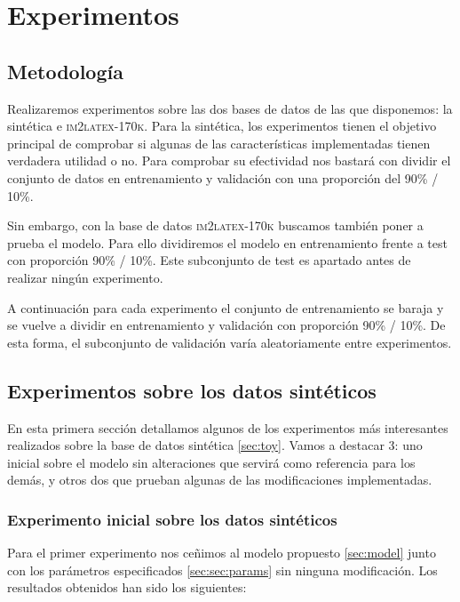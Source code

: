 \documentclass[a4paper, 20pt, dvipsnames]{article}
\begin{document}

\section{Experimentos}

\subsection{Metodología}

Realizaremos experimentos sobre las dos bases de datos de las que disponemos: la
sintética e \textsc{im2latex-170k}. Para la sintética, los experimentos tienen
el objetivo principal de comprobar si algunas de las características
implementadas tienen verdadera utilidad o no. Para comprobar su efectividad nos
bastará con dividir el conjunto de datos en entrenamiento y validación con una
proporción del 90\% / 10\%.

Sin embargo, con la base de datos \textsc{im2latex-170k} buscamos también poner
a prueba el modelo. Para ello dividiremos el modelo en entrenamiento frente a
test con proporción 90\% / 10\%. Este subconjunto de test es apartado antes de
realizar ningún experimento.

A continuación para cada experimento el conjunto de entrenamiento se baraja y se
vuelve a dividir en entrenamiento y validación con proporción 90\% / 10\%. De
esta forma, el subconjunto de validación varía aleatoriamente entre
experimentos.

\subsection{Experimentos sobre los datos sintéticos}

En esta primera sección detallamos algunos de los experimentos más interesantes
realizados sobre la base de datos sintética \ref{sec:toy}. Vamos a destacar 3:
uno inicial sobre el modelo sin alteraciones que servirá como referencia para
los demás, y otros dos que prueban algunas de las modificaciones implementadas.

\subsubsection{Experimento inicial sobre los datos sintéticos}
\label{exp:toy1}

Para el primer experimento nos ceñimos al modelo propuesto \ref{sec:model} junto
con los parámetros especificados \ref{sec:sec:params} sin ninguna
modificación. Los resultados obtenidos han sido los siguientes:
\end{document}
